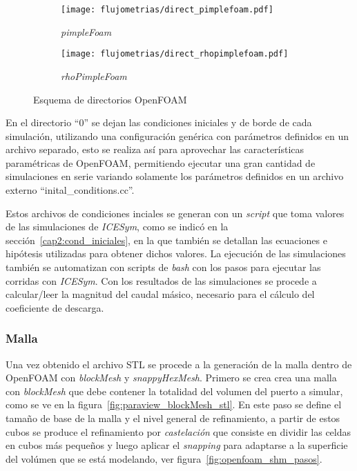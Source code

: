 \begin{figure}[ht!]
  \centering
  \begin{subfigure}[b]{0.4\textwidth}
    \centering
    \texttt{[image: flujometrias/direct\_pimplefoam.pdf]}
    \caption{\emph{pimpleFoam}\label{fig:direc_pf} }
  \end{subfigure}%
  \begin{subfigure}[b]{0.4\textwidth}
    \centering
    \texttt{[image: flujometrias/direct\_rhopimplefoam.pdf]}
    \caption{\emph{rhoPimpleFoam}\label{fig:direc_rpf} }
  \end{subfigure}
  \caption{Esquema de directorios OpenFOAM}
\end{figure}


En el directorio ``0'' se dejan las condiciones iniciales y de borde de cada
simulación, utilizando una configuración genérica con parámetros definidos en un
archivo separado, esto se realiza así para aprovechar las características
paramétricas de OpenFOAM, permitiendo ejecutar una gran cantidad de simulaciones
en serie variando solamente los parámetros definidos en un archivo externo
``inital\_conditions.cc''.

Estos archivos de condiciones inciales se generan con un \emph{script} que toma
valores de las simulaciones de \emph{ICESym}, como se indicó en la
sección~\ref{cap2:cond_iniciales}, en la que también se detallan las ecuaciones
e hipótesis utilizadas para obtener dichos valores.
%
La ejecución de las simulaciones también se automatizan con scripts de
\emph{bash} con los pasos para ejecutar las corridas con \emph{ICESym}.
%
Con los resultados de las simulaciones se procede a calcular/leer la magnitud
del caudal másico, necesario para el cálculo del coeficiente de descarga.

\subsubsection{Malla}\label{sec:cap3_of_malla}
%
Una vez obtenido el archivo STL se procede a la generación de la malla dentro de
OpenFOAM con \emph{blockMesh} y \emph{snappyHexMesh}.
%
Primero se crea crea una malla con \emph{blockMesh} que  debe contener la
totalidad del volumen del puerto a simular, como se ve en la
figura~\ref{fig:paraview_blockMesh_stl}.
%
En este paso se define el tamaño de base de la malla y el nivel general de
refinamiento, a partir de estos cubos se produce el refinamiento por
\emph{castelación} que consiste en dividir las celdas en cubos más pequeños y luego
aplicar el \emph{snapping} para adaptarse a la superficie del volúmen que se está
modelando, ver figura~\ref{fig:openfoam_shm_pasos}.
%

